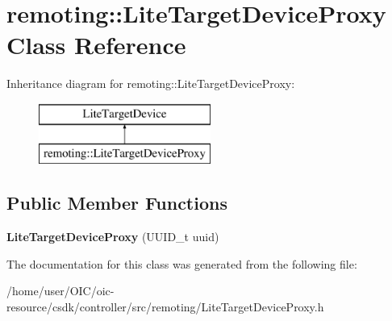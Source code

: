 \hypertarget{classremoting_1_1LiteTargetDeviceProxy}{}\section{remoting\+:\+:Lite\+Target\+Device\+Proxy Class Reference}
\label{classremoting_1_1LiteTargetDeviceProxy}
Inheritance diagram for remoting\+:\+:Lite\+Target\+Device\+Proxy\+:\begin{figure}[H]
\begin{center}
\leavevmode
\includegraphics[height=2.000000cm]{classremoting_1_1LiteTargetDeviceProxy}
\end{center}
\end{figure}
\subsection*{Public Member Functions}
\begin{DoxyCompactItemize}
\item 
\hypertarget{classremoting_1_1LiteTargetDeviceProxy_aba6f2d0a8312fedefa2bbaca24e9aea2}{}{\bfseries Lite\+Target\+Device\+Proxy} (U\+U\+I\+D\+\_\+t uuid)\label{classremoting_1_1LiteTargetDeviceProxy_aba6f2d0a8312fedefa2bbaca24e9aea2}

\end{DoxyCompactItemize}


The documentation for this class was generated from the following file\+:\begin{DoxyCompactItemize}
\item 
/home/user/\+O\+I\+C/oic-\/resource/csdk/controller/src/remoting/Lite\+Target\+Device\+Proxy.\+h\end{DoxyCompactItemize}
